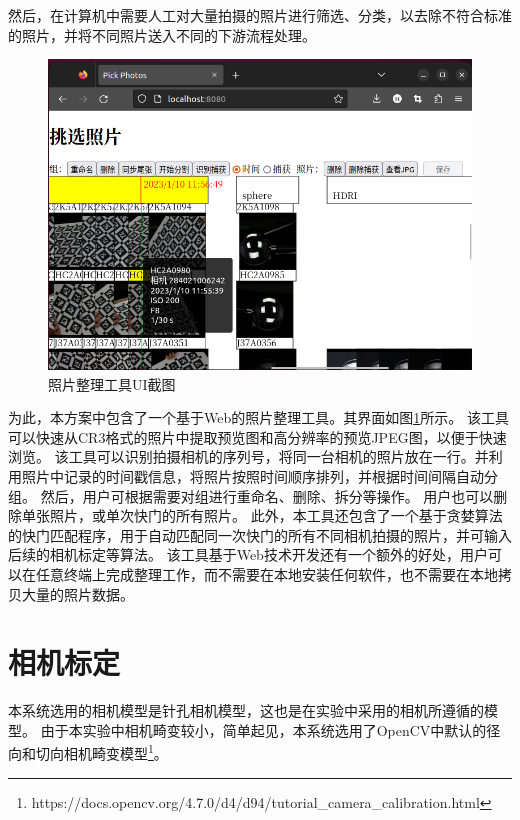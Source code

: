 \documentclass{ctexart}
\begin{document}
然后，在计算机中需要人工对大量拍摄的照片进行筛选、分类，以去除不符合标准的照片，并将不同照片送入不同的下游流程处理。
\begin{figure}
\centering
\includegraphics[width=\textwidth]{figures/pick_photo}
\caption{照片整理工具UI截图}
\label{fig:pick_photo}
\end{figure}
为此，本方案中包含了一个基于Web的照片整理工具。其界面如图\ref{fig:pick_photo}所示。
该工具可以快速从CR3格式的照片中提取预览图和高分辨率的预览JPEG图，以便于快速浏览。
该工具可以识别拍摄相机的序列号，将同一台相机的照片放在一行。并利用照片中记录的时间戳信息，将照片按照时间顺序排列，并根据时间间隔自动分组。
然后，用户可根据需要对组进行重命名、删除、拆分等操作。
用户也可以删除单张照片，或单次快门的所有照片。
此外，本工具还包含了一个基于贪婪算法的快门匹配程序，用于自动匹配同一次快门的所有不同相机拍摄的照片，并可输入后续的相机标定等算法。
该工具基于Web技术开发还有一个额外的好处，用户可以在任意终端上完成整理工作，而不需要在本地安装任何软件，也不需要在本地拷贝大量的照片数据。

\section{相机标定}

本系统选用的相机模型是针孔相机模型，这也是在实验中采用的相机所遵循的模型。
由于本实验中相机畸变较小，简单起见，本系统选用了OpenCV中默认的径向和切向相机畸变模型\footnote{https://docs.opencv.org/4.7.0/d4/d94/tutorial\_camera\_calibration.html}。
\end{document}
